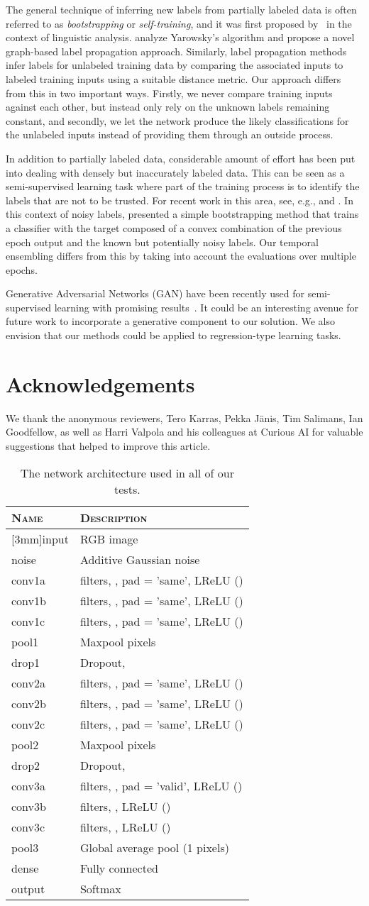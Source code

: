 \documentclass{article}
\newcommand{\networkArch}{
\begin{table}[t]
\centering
\caption{\label{tbl:network}The network architecture used in all of our tests.
}
\vspace*{\baselineskip}
\begin{tabular}{|L|L|}
\hline
\textsc{Name} & \textsc{Description} \\
\hline
\raisebox{0mm}[3mm]{}input  &  RGB image \\
noise  & Additive Gaussian noise  \\
conv1a &  filters, , pad = 'same', LReLU ()\\
conv1b &  filters, , pad = 'same', LReLU () \\
conv1c &  filters, , pad = 'same', LReLU () \\
pool1   & Maxpool  pixels \\
drop1   & Dropout,  \\
conv2a &  filters, , pad = 'same', LReLU () \\
conv2b &  filters, , pad = 'same', LReLU () \\
conv2c &  filters, , pad = 'same', LReLU () \\
pool2   & Maxpool  pixels \\
drop2   & Dropout,  \\
conv3a &  filters, , pad = 'valid', LReLU () \\
conv3b &  filters, , LReLU () \\
conv3c &  filters, , LReLU () \\
pool3   & Global average pool (1 pixels) \\
dense & Fully connected \\
output & Softmax \\\hline
\end{tabular}
\end{table}
}
\begin{document}
The general technique of inferring new labels from partially labeled data is often referred to as {\em bootstrapping} or
{\em self-training}, and it was first proposed by~\cite{yarowsky95} in the context of linguistic analysis.
\cite{graphprop} analyze Yarowsky's algorithm and propose a novel graph-based label propagation
approach. Similarly, label propagation methods~\citep{zhuprop02} infer labels for unlabeled training
data by comparing the associated inputs to labeled training inputs using a suitable distance metric. Our
approach differs from this in two important ways. Firstly, we never compare training inputs against each other,
but instead only rely on the unknown labels remaining constant, and secondly, we
let the network produce the likely classifications for the unlabeled inputs instead of providing them through an outside process.

In addition to partially labeled data, considerable amount of effort has been put into dealing with
densely but inaccurately labeled data. This can be seen as a semi-supervised learning task where
part of the training process is to identify the labels that are not to be trusted. For recent work in this area,
see, e.g., \cite{sukhbaatar14} and \cite{patrini16}. 
In this context of noisy labels, \cite{reed14} presented a simple bootstrapping method that trains a classifier
with the target composed of a convex combination of the previous epoch output and the known but potentially noisy
labels. Our temporal ensembling differs from this by taking into account the evaluations over multiple epochs.

Generative Adversarial Networks (GAN) have been recently used for semi-supervised learning with promising 
results~\citep{adgm,catgan,odena16,googan}. It could be an interesting avenue for future work to incorporate a generative 
component to our solution.
We also envision that our methods could be applied to regression-type learning tasks.

\section{Acknowledgements}

We thank the anonymous reviewers, Tero Karras, Pekka J\"{a}nis, Tim Salimans, Ian Goodfellow, as well as Harri Valpola and his colleagues at Curious AI for valuable suggestions that helped to improve this article.

\networkArch



\end{document}
